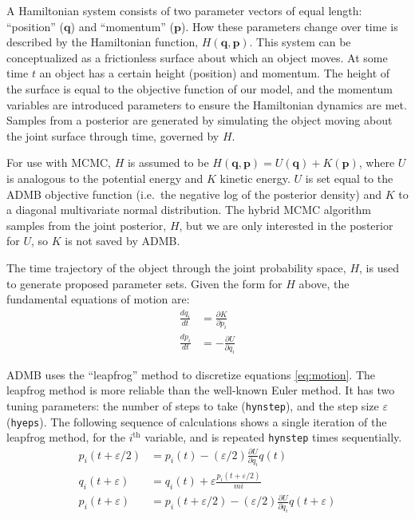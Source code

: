 \documentclass{article}\usepackage[]{graphicx}\usepackage[]{color}
\begin{document}
A Hamiltonian system consists of two parameter vectors of
equal length: ``position'' ($\mathbf{q}$) and ``momentum''
($\mathbf{p}$). How these parameters change over time is
described by the Hamiltonian function,
$H(\mathbf{q},\mathbf{p})$. This system can be
conceptualized as a frictionless surface about which an
object moves. At some time $t$ an object has a certain
height (position) and momentum. The height of the surface is
equal to the objective function of our model, and the
momentum variables are introduced parameters to ensure the
Hamiltonian dynamics are met. Samples from a posterior are
generated by simulating the object moving about the joint
surface through time, governed by $H$.

For use with MCMC, $H$ is assumed to be
$H(\mathbf{q},\mathbf{p})=U(\mathbf{q})+K(\mathbf{p})$,
where $U$ is analogous to the potential energy and $K$
kinetic energy. $U$ is set equal to the ADMB objective
function (i.e.\ the negative log of the posterior density)
and $K$ to a diagonal multivariate normal distribution. The
hybrid MCMC algorithm samples from the joint posterior, $H$,
but we are only interested in the posterior for $U$, so $K$
is not saved by ADMB.

The time trajectory of the object through the joint
probability space, $H$, is used to generate proposed
parameter sets. Given the form for $H$ above, the
fundamental equations of motion are:
\begin{align}
  \label{eq:motion}
  \frac{dq_i}{dt} &= \frac{\partial{K}}{\partial{p_i}}\\
  \frac{dp_i}{dt} &= -\frac{\partial{U}}{\partial{q_i}}
\end{align}

ADMB uses the ``leapfrog'' method to discretize equations
\eqref{eq:motion}. The leapfrog method is more reliable than
the well-known Euler method. It has two tuning parameters:
the number of steps to take (\texttt{hynstep}), and the step
size $\varepsilon$ (\texttt{hyeps}). The following sequence of
calculations shows a single iteration of the leapfrog
method, for the $i^{\text{th}}$ variable, and is repeated
\texttt{hynstep} times sequentially.
\begin{align*}
  p_i(t+\varepsilon/2)&=p_i(t)-(\varepsilon/2)\frac{\partial{U}}{\partial{q_i}}q(t)\\
  q_i(t+\varepsilon)&=q_i(t)+\varepsilon \frac{p_i(t+\varepsilon/2)}{mi}\\
  p_i(t+\varepsilon)&=p_i(t+\varepsilon/2)-(\varepsilon/2)\frac{\partial{U}}{\partial{q_i}}q(t+\varepsilon)
\end{align*}
\end{document}
